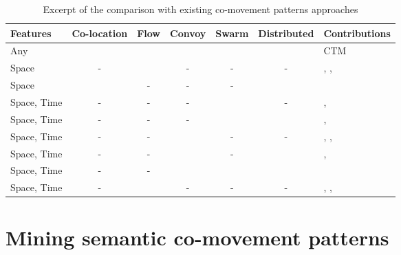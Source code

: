 \documentclass[
]{ceurart}
\newcommand{\cmark}{\ding{51}}%
\begin{document}
\begin{table}[t]
\centering
\scriptsize
\caption{Excerpt of the comparison with existing co-movement patterns approaches}%
\label{tab:related}
\begin{tabular}{lcccccl}
\toprule
Features & Co-location & Flow & Convoy & Swarm & Distributed & Contributions \\
\midrule
Any & \cmark & \cmark & \cmark & \cmark & \cmark & CTM \\
Space & - & \cmark & - & - & - & \cite{DBLP:conf/mdm/SilvaLMZC20}, \cite{yang2021scpm}, \cite{tritsarolis2021online} \\
Space & \cmark & - & - & - & \cmark & \cite{fonseca2022multi} \\
Space, Time & - & - & - & \cmark & - & \cite{DBLP:conf/sigmod/LeeHW07}, \cite{DBLP:journals/pvldb/LiDHK10}\\%
Space, Time & - & - & - & \cmark & \cmark & \cite{DBLP:conf/icnc/HuKLZ15}, \cite{tampakis2019scalable} \\
Space, Time & - & - & \cmark & - & - & \cite{DBLP:conf/ssdbm/AungT10}, \cite{DBLP:journals/pvldb/OrakzaiCP19}, \cite{DBLP:conf/cikm/Liu0LLYW21} \\
Space, Time & - & - & \cmark & - & \cmark & \cite{DBLP:journals/geoinformatica/OrakzaiPC21}, \cite{tritsarolis2022predicting} \\
Space, Time & - & - & \cmark & \cmark & \cmark & \cite{DBLP:journals/pvldb/FanZWT16} \\
Space, Time & - & \cmark & - & - & - & \cite{DBLP:journals/tmc/HanLO15}, \cite{DBLP:journals/tits/KumarWRLKP18}, \cite{DBLP:journals/pvldb/WangBCSQ19} \\
\bottomrule
\end{tabular}
\end{table}

\section{Mining semantic co-movement patterns}
\label{sec:Overview}
\end{document}

